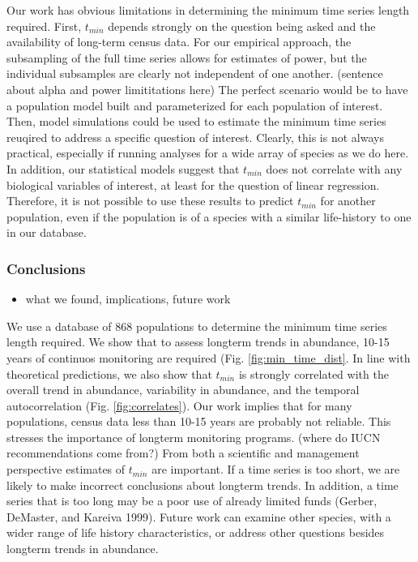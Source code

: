 \documentclass[12pt,]{article}
\providecommand{\tightlist}{%
  \setlength{\itemsep}{0pt}\setlength{\parskip}{0pt}}
\begin{document}
Our work has obvious limitations in determining the minimum time series
length required. First, \(t_{min}\) depends strongly on the question
being asked and the availability of long-term census data. For our
empirical approach, the subsampling of the full time series allows for
estimates of power, but the individual subsamples are clearly not
independent of one another. (sentence about alpha and power
limititations here) The perfect scenario would be to have a population
model built and parameterized for each population of interest. Then,
model simulations could be used to estimate the minimum time series
reuqired to address a specific question of interest. Clearly, this is
not always practical, especially if running analyses for a wide array of
species as we do here. In addition, our statistical models suggest that
\(t_{min}\) does not correlate with any biological variables of
interest, at least for the question of linear regression. Therefore, it
is not possible to use these results to predict \(t_{min}\) for another
population, even if the population is of a species with a similar
life-history to one in our database.

\subsubsection{Conclusions}\label{conclusions}

\begin{itemize}
\tightlist
\item
  what we found, implications, future work
\end{itemize}

We use a database of 868 populations to determine the minimum time
series length required. We show that to assess longterm trends in
abundance, 10-15 years of continuos monitoring are required (Fig.
\ref{fig:min_time_dist}. In line with theoretical predictions, we also
show that \(t_{min}\) is strongly correlated with the overall trend in
abundance, variability in abundance, and the temporal autocorrelation
(Fig. \ref{fig:correlates}). Our work implies that for many populations,
census data less than 10-15 years are probably not reliable. This
stresses the importance of longterm monitoring programs. (where do IUCN
recommendations come from?) From both a scientific and management
perspective estimates of \(t_{min}\) are important. If a time series is
too short, we are likely to make incorrect conclusions about longterm
trends. In addition, a time series that is too long may be a poor use of
already limited funds (Gerber, DeMaster, and Kareiva 1999). Future work
can examine other species, with a wider range of life history
characteristics, or address other questions besides longterm trends in
abundance.
\end{document}
